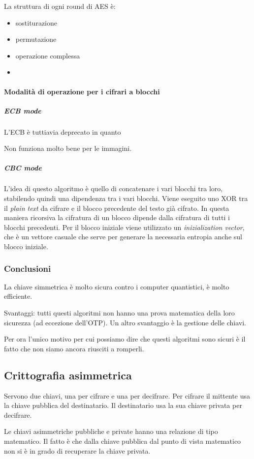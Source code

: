 
La struttura di ogni round di AES è:
\begin{itemize}
 \item sostiturazione
 \item permutazione
 \item operazione complessa
 \item {}
\end{itemize}

\paragraph{Modalità di operazione per i cifrari a blocchi}


\subparagraph{ECB mode}


L'ECB è tuttiavia deprecato in quanto 

Non funziona molto bene per le immagini.

\subparagraph{CBC mode}

L'idea di questo algoritmo è quello di concatenare i vari blocchi tra loro, 
stabilendo quindi una dipendenza tra i vari blocchi. Viene eseguito uno XOR tra 
il \textit{plain text} da cifrare e il blocco precedente del testo già cifrato. 
In questa maniera ricorsiva la cifratura di un blocco dipende dalla cifratura di 
tutti i blocchi precedenti. Per il blocco iniziale viene utilizzato un 
\textit{inizialization vector}, che è un vettore casuale che serve per generare 
la necessaria entropia anche sul blocco iniziale.


\subsubsection{Conclusioni}

La chiave simmetrica è molto sicura contro i computer quantistici, è molto 
efficiente.

Svantaggi: tutti questi algoritmi non hanno una prova matematica della loro 
sicurezza (ad eccezione dell'OTP). Un altro svantaggio è la gestione delle 
chiavi.

Per ora l'unico motivo per cui possiamo dire che questi algoritmi sono sicuri è 
il fatto che non siamo ancora riusciti a romperli.

\subsection{Crittografia asimmetrica}

Servono due chiavi, una per cifrare e una per decifrare. Per cifrare il 
mittente usa la chiave pubblica del destinatario. Il destinatario usa la sua 
chiave privata per decifrare.


Le chiavi asimmetriche pubbliche e private hanno una relazione di tipo 
matematico. Il fatto è che dalla chiave pubblica dal punto di vista matematico 
non si è in grado di recuperare la chiave privata.
